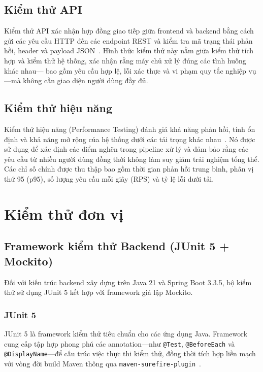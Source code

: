 \subsection{Kiểm thử API}

Kiểm thử API xác nhận hợp đồng giao tiếp giữa frontend và backend bằng cách gửi các
yêu cầu HTTP đến các endpoint REST và kiểm tra mã trạng thái phản hồi, header và
payload JSON~\cite{api_testing}. Hình thức kiểm thử này nằm giữa kiểm thử tích hợp
và kiểm thử hệ thống, xác nhận rằng máy chủ xử lý đúng các tình huống khác nhau---
bao gồm yêu cầu hợp lệ, lỗi xác thực và vi phạm quy tắc nghiệp vụ---mà không cần
giao diện người dùng đầy đủ.

\subsection{Kiểm thử hiệu năng}

Kiểm thử hiệu năng (Performance Testing) đánh giá khả năng phản hồi, tính ổn định
và khả năng mở rộng của hệ thống dưới các tải trọng khác nhau~\cite{performance_testing}.
Nó được sử dụng để xác định các điểm nghẽn trong pipeline xử lý và đảm bảo rằng
các yêu cầu từ nhiều người dùng đồng thời không làm suy giảm trải nghiệm tổng thể.
Các chỉ số chính được thu thập bao gồm thời gian phản hồi trung bình, phân vị thứ
95 (p95), số lượng yêu cầu mỗi giây (RPS) và tỷ lệ lỗi dưới tải.

\section{Kiểm thử đơn vị}

\subsection{Framework kiểm thử Backend (JUnit 5 + Mockito)}

Đối với kiến trúc backend xây dựng trên Java 21 và Spring Boot 3.3.5, bộ kiểm thử
sử dụng JUnit 5 kết hợp với framework giả lập Mockito.

\subsubsection{JUnit 5}
JUnit 5 là framework kiểm thử tiêu chuẩn cho các ứng dụng Java. Framework cung cấp
tập hợp phong phú các annotation---như \texttt{@Test}, \texttt{@BeforeEach} và
\texttt{@DisplayName}---để cấu trúc việc thực thi kiểm thử, đồng thời tích hợp
liền mạch với vòng đời build Maven thông qua \texttt{maven-surefire-plugin}~\cite{junit5}.

